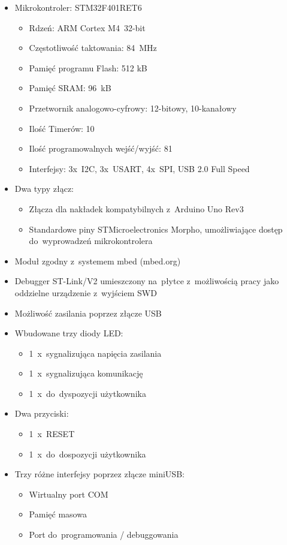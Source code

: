 \begin{itemize}
	\item Mikrokontroler: STM32F401RET6
    \begin{itemize}[label=$\star$]
        \item Rdzeń: ARM Cortex M4~32-bit
        \item Częstotliwość taktowania: 84~MHz
        \item Pamięć programu Flash: 512 kB
        \item Pamięć SRAM: 96~kB
        \item Przetwornik analogowo-cyfrowy: 12-bitowy, 10-kanałowy
        \item Ilość Timerów: 10
        \item Ilość programowalnych wejść/wyjść: 81
        \item Interfejsy: 3x~I2C, 3x~USART, 4x~SPI, USB 2.0 Full Speed
    \end{itemize}
	\item Dwa typy złącz:
    \begin{itemize}[label=$\star$]
	    \item Złącza dla nakładek kompatybilnych z~Arduino Uno Rev3
        \item Standardowe piny STMicroelectronics Morpho, umożliwiające dostęp do~wyprowadzeń mikrokontrolera
    \end{itemize}
    \item Moduł zgodny z~systemem mbed (mbed.org)
    \item Debugger ST-Link/V2 umieszczony na~płytce z~możliwością pracy jako oddzielne urządzenie z~wyjściem SWD
    \item Możliwość zasilania poprzez złącze USB
    \item Wbudowane trzy diody LED:
    \begin{itemize}[label=$\star$]
        \item 1~x~sygnalizująca napięcia zasilania
        \item 1~x~sygnalizująca komunikację
        \item 1~x~do~dyspozycji użytkownika
    \end{itemize}
    \item Dwa przyciski:
    \begin{itemize}[label=$\star$]
        \item 1~x~RESET
        \item 1~x~do~dospozycji użytkownika
    \end{itemize}
    \item Trzy różne interfejsy poprzez złącze miniUSB:
    \begin{itemize}[label=$\star$]
        \item Wirtualny port COM
        \item Pamięć masowa
        \item Port do~programowania / debuggowania
    \end{itemize}
\end{itemize}

